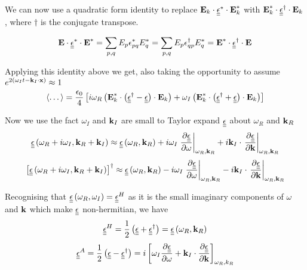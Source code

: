 We can now use a quadratic form identity to replace $\textbf{E}_k \cdot \underline{\underline{\epsilon}}^{*} \cdot \textbf{E}_k^{*}$ with $\textbf{E}_k^{*} \cdot \underline{\underline{\epsilon}}^{\dagger} \cdot \textbf{E}_k$, where $\dagger$ is the conjugate transpose. 

\begin{equation}
	\textbf{E} \cdot \underline{\underline{\epsilon}}^{*} \cdot \textbf{E}^{*} = \sum_{p,q} E_p \epsilon_{pq}^{*} E_q^{*} = \sum_{p,q} E_p \epsilon_{qp}^{\dagger} E_q^{*} = \textbf{E}^{*} \cdot \underline{\underline{\epsilon}}^{\dagger} \cdot \textbf{E}
\end{equation}

Applying this identity above we get, also taking the opportunity to assume $e^{2 \left( \omega_I t - \textbf{k}_I \cdot \textbf{x} \right)} \approx 1$
\begin{equation}
	\left \langle \dots \right \rangle = \frac{\epsilon_0}{4} \left[ i \omega_R \left( \textbf{E}_k^* \cdot \left( \underline{\underline{\epsilon}}^{\dagger} - \underline{\underline{\epsilon}} \right) \cdot \textbf{E}_k \right) + \omega_I \left( \textbf{E}_k^* \cdot \left( \underline{\underline{\epsilon}}^{\dagger} + \underline{\underline{\epsilon}} \right) \cdot \textbf{E}_k \right) \right]
\end{equation}

Now we use the fact $\omega_I$ and $\textbf{k}_I$ are small to Taylor expand $\underline{\underline{\epsilon}}$ about $\omega_R$ and $\textbf{k}_R$
\begin{equation}
	\underline{\underline{\epsilon}} \left( \omega_R + i \omega_I, \textbf{k}_R + \textbf{k}_I \right) \approx \underline{\underline{\epsilon}} \left( \omega_R, \textbf{k}_R \right) + i \omega_I \left. \frac{\partial \underline{\underline{\epsilon}}}{\partial \omega} \right|_{\omega_R, \textbf{k}_R} + i \textbf{k}_I \cdot \left. \frac{\partial \underline{\underline{\epsilon}}}{\partial \textbf{k}} \right|_{\omega_R, \textbf{k}_R}
\end{equation}
\begin{equation}
	\left[ \underline{\underline{\epsilon}} \left( \omega_R + i \omega_I, \textbf{k}_R + \textbf{k}_I \right) \right]^{\dagger} \approx \underline{\underline{\epsilon}} \left( \omega_R, \textbf{k}_R \right) - i \omega_I \left. \frac{\partial \underline{\underline{\epsilon}}}{\partial \omega} \right|_{\omega_R, \textbf{k}_R} - i \textbf{k}_I \cdot \left. \frac{\partial \underline{\underline{\epsilon}}}{\partial \textbf{k}} \right|_{\omega_R, \textbf{k}_R}
\end{equation}

Recognising that $\underline{\underline{\epsilon}} \left( \omega_R, \omega_I \right) = \underline{\underline{\epsilon}}^H$ as it is the small imaginary components of $\omega$ and $\textbf{k}$ which make $\underline{\underline{\epsilon}}$ non-hermitian, we have
\begin{equation}
	\underline{\underline{\epsilon}}^H = \frac{1}{2} \left( \underline{\underline{\epsilon}} + \underline{\underline{\epsilon}}^{\dagger} \right) = \underline{\underline{\epsilon}} \left( \omega_R, \textbf{k}_R \right)
\end{equation}
\begin{equation}
	\underline{\underline{\epsilon}}^A = \frac{1}{2} \left( \underline{\underline{\epsilon}} - \underline{\underline{\epsilon}}^{\dagger} \right) = i \left[ \omega_I \frac{\partial \underline{\underline{\epsilon}}}{\partial \omega} + \textbf{k}_I \cdot \frac{\partial \underline{\underline{\epsilon}}}{\partial \textbf{k}} \right]_{\omega_R, k_R}
\end{equation}

